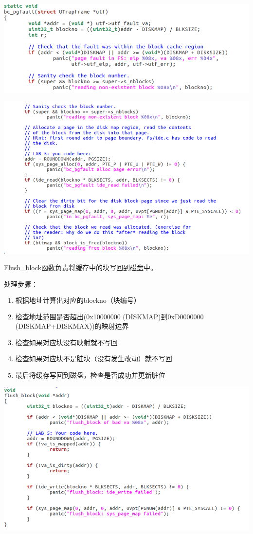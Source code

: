 \begin{ExerciseList}
  \includegraphics[width=6in]{figures/lab5/image69.png}

  \includegraphics[width=6in]{figures/lab5/image70.png}

  Flush\_block函数负责将缓存中的块写回到磁盘中。

  处理步骤：

  \begin{enumerate}
  \item 根据地址计算出对应的blockno（块编号）
  \item 检查地址范围是否超出(0x10000000 (DISKMAP)到0xD0000000 (DISKMAP+DISKMAX))的映射边界
  \item 检查如果对应块没有映射就不写回
  \item 检查如果对应块不是脏块（没有发生改动）就不写回
  \item 最后将缓存写回到磁盘，检查是否成功并更新脏位
  \end{enumerate}

  \includegraphics[width=6in]{figures/lab5/image71.png}


\end{ExerciseList}
